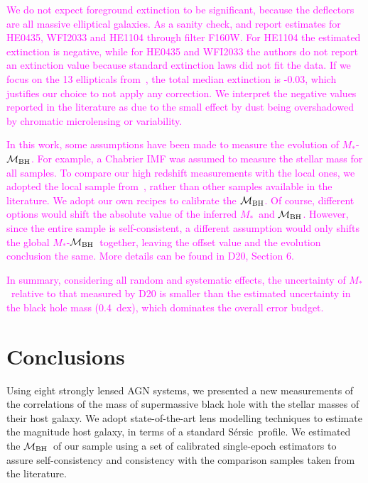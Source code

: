 \documentclass[fleqn,usenatbib]{mnras}
\newcommand{\mbh}{$\mathcal M_{\rm BH}$}
\newcommand{\sersic}{S\'ersic}
\newcommand{\mstar}{{$M_*$}}
\newcommand{\pink}[1]{{\textcolor{magenta}{#1}}}
\begin{document}
\pink{We do not expect foreground extinction to be significant, because the deflectors are all massive elliptical galaxies. As a sanity check, \citet{1999ApJ...523..617F} and \citet{2008A&A...485..403O} report estimates for HE0435, WFI2033 and HE1104 through filter F160W. For HE1104 the estimated extinction is negative, while for HE0435 and WFI2033 the authors do not report an extinction value because standard extinction laws did not fit the data.
If we focus on the 13 ellipticals from~\citet{1999ApJ...523..617F}, the total median extinction is -0.03, which justifies our choice to not apply any correction.
We interpret the negative values reported in the literature as due to the small effect by dust being overshadowed by chromatic microlensing or variability.}




\pink{In this work, some assumptions have been made to measure the evolution of \mstar-\mbh. For example, a Chabrier IMF was assumed to measure the stellar mass for all samples. To compare our high redshift measurements with the local ones, we adopted the local sample from~\citet{Bennert++2011, H+R04}, rather than other samples available in the literature. We adopt our own recipes to calibrate the \mbh. Of course, different options would shift the absolute value of the inferred \mstar\ and \mbh. However, since the entire sample is self-consistent, a different assumption would only shifts the global \mstar-\mbh\ together, leaving the offset value and the evolution conclusion the same. More details can be found in D20, Section 6.}

\pink{In summary, considering all random and systematic effects, the uncertainty of \mstar\ relative to that measured by D20 is smaller than the estimated uncertainty in the black hole mass (0.4~dex), which dominates the overall error budget.}

\section{Conclusions}\label{sec:con}
Using eight strongly lensed AGN systems, we presented a new measurements of the correlations of the mass of supermassive black hole with the stellar masses of their host galaxy. We adopt state-of-the-art lens modelling techniques to estimate the magnitude host galaxy, in terms of a standard \sersic\ profile. We estimated the \mbh\ of our sample using a set of calibrated single-epoch estimators to assure self-consistency and consistency with the comparison samples taken from the literature.
\end{document}
